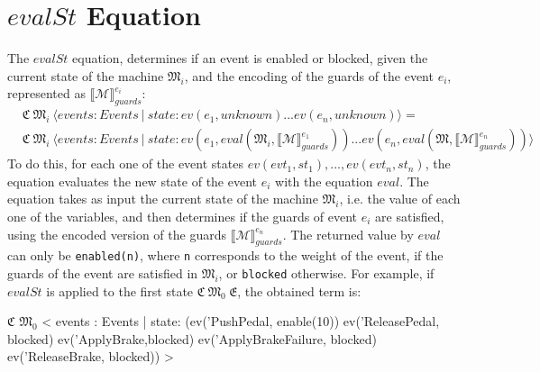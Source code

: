 \section{$evalSt$ Equation}
The $evalSt$ equation, determines if an event is enabled or blocked, given the current state of the machine $\mathfrak{M}_i$, and the encoding of the guards of the event $e_i$, represented as $\llbracket \mathscr{M} \rrbracket^{e_i}_{guards}$:
\begin{align*}
    &\mathfrak{C} \ \mathfrak{M}_{i} \ \langle events : Events \ | \ state: ev(e_1,unknown) ... ev(e_n, unknown) \rangle = \\
    &\mathfrak{C} \ \mathfrak{M}_{i} \ \langle events : Events \ | \ state: ev(e_1, eval(\mathfrak{M}_i, \llbracket \mathscr{M} \rrbracket^{e_1}_{guards})) ... ev(e_n, eval(\mathfrak{M}, \llbracket \mathscr{M} \rrbracket^{e_n}_{guards})) \rangle
\end{align*}
To do this, for each one of the event states $ev(evt_1,st_1), ..., ev(evt_n,st_n)$, the equation evaluates the new state of the event $e_i$ with the equation $eval$. The equation takes as input the current state of the machine $\mathfrak{M}_i$, i.e. the value of each one of the variables, and then determines if the guards of event $e_i$ are satisfied, using the encoded version of the guards  $\llbracket \mathscr{M} \rrbracket^{e_n}_{guards}$. The returned value by $eval$ can only be \texttt{enabled(n)}, where \texttt{n} corresponds to the weight of the event, if the guards of the event are satisfied in $\mathfrak{M}_i$, or \texttt{blocked} otherwise. For example, if $evalSt$ is applied to the first state $\mathfrak{C} \ \mathfrak{M}_{0}  \ \mathfrak{E}$, the obtained term is:
\begin{maude}

$\mathfrak{C}$ $\mathfrak{M}_0$ < events : Events | state: (ev('PushPedal, enable(10)) 
                                 ev('ReleasePedal, blocked) 
                                 ev('ApplyBrake,blocked) 
                                 ev('ApplyBrakeFailure, blocked)
                                 ev('ReleaseBrake, blocked)) >
\end{maude}



